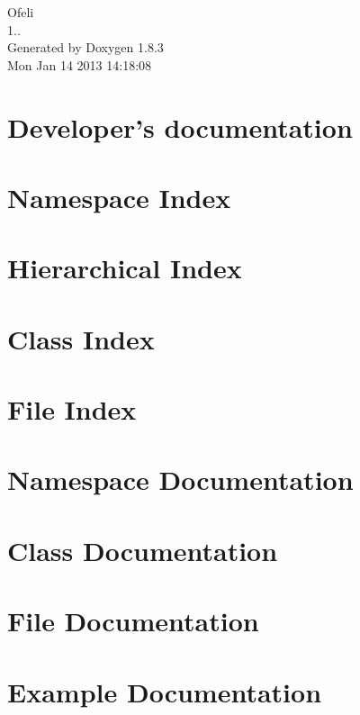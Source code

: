 \documentclass{book}
\begin{document}
\hypersetup{pageanchor=false,citecolor=blue}
\begin{titlepage}
\vspace*{7cm}
\begin{center}
{\Large Ofeli \\[1ex]\large 1.. }\\
\vspace*{1cm}
{\large Generated by Doxygen 1.8.3}\\
\vspace*{0.5cm}
{\small Mon Jan 14 2013 14:18:08}\\
\end{center}
\end{titlepage}
\clearemptydoublepage
{}
\tableofcontents
\clearemptydoublepage
{}
\hypersetup{pageanchor=true,citecolor=blue}
\chapter{Developer's documentation}
\label{index}\hypertarget{index}{}
\chapter{Namespace Index}

\chapter{Hierarchical Index}

\chapter{Class Index}

\chapter{File Index}

\chapter{Namespace Documentation}

\chapter{Class Documentation}




















\chapter{File Documentation}

\chapter{Example Documentation}


\printindex
\end{document}
